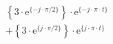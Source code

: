 \[
\begin{split}
& \left \{ 3 \cdot \textrm{e}^{\{-j \cdot \pi/2 \}} \right \} \cdot \textrm{e}^{\{- j \cdot \pi \cdot t \}}\\
&+\left \{ 3 \cdot \textrm{e}^{\{ j \cdot \pi/2 \}} \right \} \cdot \textrm{e}^{\{  j \cdot \pi \cdot t \}}
\end{split}
\]

